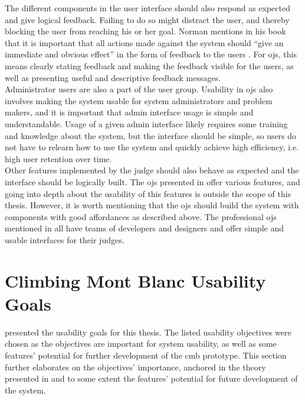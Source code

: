 The different components in the user interface should also respond as expected and give logical feedback. Failing to do so might distract the user, and thereby blocking the user from reaching his or her goal. Norman mentions in his book that it is important that all actions made against the system should ``give an immediate and obvious effect'' in the form of feedback to the users \cite{norman1988design}. For \glspl{oj}, this means clearly stating feedback and making the feedback visible for the users, as well as presenting useful and descriptive feedback messages.\\

Administrator users are also a part of the user group. Usability in \glspl{oj} also involves making the system usable for system administrators and problem makers, and it is important that admin interface usage is simple and understandable. Usage of a given admin interface likely requires some training and knowledge about the system, but the interface should be simple, so users do not have to relearn how to use the system and quickly achieve high efficiency, i.e. high user retention over time. \\

Other features implemented by the judge should also behave as expected and the interface should be logically built. The \glspl{oj} presented in  offer various features, and going into depth about the usability of this features is outside the scope of this thesis. However, it is worth mentioning that the \glspl{oj} should build the system with components with good affordances as described above. The professional \glspl{oj} mentioned in  all have teams of developers and designers and offer simple and usable interfaces for their judges.

\section{Climbing Mont Blanc Usability Goals}
\label{sec:cmb-usability}
 presented the usability goals for this thesis. The listed usability objectives were chosen as the objectives are important for system usability, as well as some features' potential for further development of the \gls{cmb} prototype. This section further elaborates on the objectives' importance, anchored in the theory presented in  and to some extent the features' potential for future development of the system. \\

